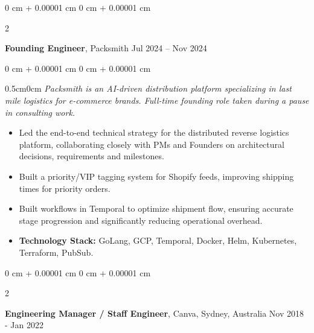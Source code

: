 \documentclass[10pt, letterpaper]{article}
\newenvironment{highlights}{
    \begin{itemize}[
        topsep=0.10 cm,
        parsep=0.10 cm,
        partopsep=0pt,
        itemsep=0pt,
        leftmargin=0 cm + 10pt
    ]
}{
    \end{itemize}
} %
\newenvironment{onecolentry}{
    \begin{adjustwidth}{
        0 cm + 0.00001 cm
    }{
        0 cm + 0.00001 cm
    }
}{
    \end{adjustwidth}
} %
\newenvironment{twocolentry}[2][]{
    \onecolentry
    \def\secondColumn{#2}
    \setcolumnwidth{\fill, 4.5 cm}
    \begin{paracol}{2}
}{
    \switchcolumn \raggedleft \secondColumn
    \end{paracol}
    \endonecolentry
} %
\begin{document}
        \vspace{0.15 cm}
        \begin{twocolentry}{
            Jul 2024 – Nov 2024
        }
        \textbf{Founding Engineer}, Packsmith\end{twocolentry}
        \vspace{0.10 cm}
        \begin{onecolentry}
            \begin{adjustwidth}{0.5cm}{0cm}
            \textit{Packsmith is an AI-driven distribution platform specializing in last mile logistics for e-commerce brands. Full-time founding role taken during a pause in consulting work.}
            \end{adjustwidth}

            \vspace{0.10 cm}
            \begin{highlights}
                \item Led the end-to-end technical strategy for the distributed reverse logistics platform, collaborating closely with PMs and Founders on architectural decisions, requirements and milestones.
                \item Built a priority/VIP tagging system for Shopify feeds, improving shipping times for priority orders.
                \item Built workflows in Temporal to optimize shipment flow, ensuring accurate stage progression and significantly reducing operational overhead.
                \item \textbf{Technology Stack:} GoLang, GCP, Temporal, Docker, Helm, Kubernetes, Terraform, PubSub.
            \end{highlights}
        \end{onecolentry}

        \vspace{0.15 cm}

        \begin{twocolentry}{
            Nov 2018 - Jan 2022
        }
            \textbf{Engineering Manager / Staff Engineer}, Canva, Sydney, Australia\end{twocolentry}
\end{document}
